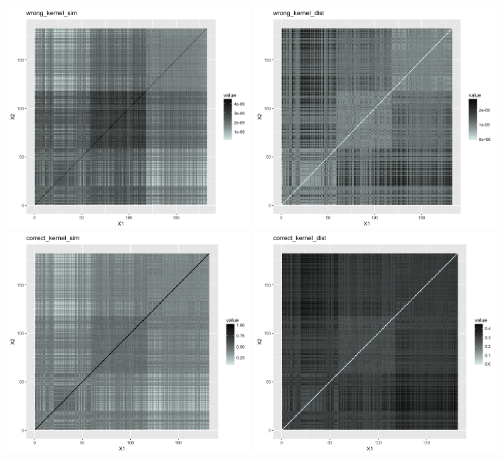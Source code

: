\documentclass[11pt]{article}
\begin{document}
\clearpage
\noindent \includegraphics[width=0.48\textwidth]{wrongkernelsim.png}
\includegraphics[width=0.48\textwidth]{wrongkerneldist.png}\\
\includegraphics[width=0.48\textwidth]{correctkernelsim.png}
\includegraphics[width=0.48\textwidth]{correctkerneldist.png}
\end{document}
